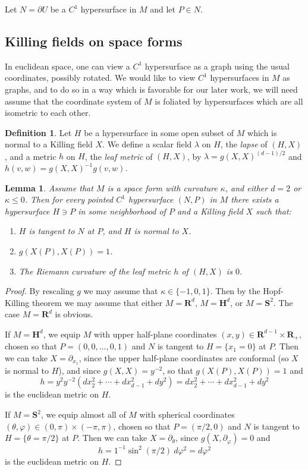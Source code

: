 \documentclass[reqno,12pt,letterpaper]{amsart}
\newcommand{\RR}{\mathbf{R}}
\newcommand{\Hyp}{\mathbf H}
\newcommand{\Sph}{\mathbf S}
\newcommand{\dfn}[1]{\emph{#1}\index{#1}}
\newtheorem{lemma}[theorem]{Lemma}
\theoremstyle{definition}
\newtheorem{definition}[theorem]{Definition}
\numberwithin{equation}{section}
\begin{document}
Let $N = \partial U$ be a $C^1$ hypersurface in $M$ and let $P \in N$.

\subsection{Killing fields on space forms}
In euclidean space, one can view a $C^1$ hypersurface as a graph using the usual coordinates, possibly rotated.
We would like to view $C^1$ hypersurfaces in $M$ as graphs, and to do so in a way which is favorable for our later work, we will need assume that the coordinate system of $M$ is foliated by hypersurfaces which are all isometric to each other.

\begin{definition}
Let $H$ be a hypersurface in some open subset of $M$ which is normal to a Killing field $X$.
We define a scalar field $\lambda$ on $H$, the \dfn{lapse} of $(H, X)$, and a metric $h$ on $H$, the \dfn{leaf metric} of $(H, X)$, by $\lambda = g(X, X)^{(d - 1)/2}$ and $h(v, w) = g(X, X)^{-1} g(v, w)$.
\end{definition}

\begin{lemma}\label{hopfKilling}
Assume that $M$ is a space form with curvature $\kappa$, and either $d = 2$ or $\kappa \leq 0$.
Then for every pointed $C^1$ hypersurface $(N, P)$ in $M$ there exists a hypersurface $H \ni P$ in some neighborhood of $P$ and a Killing field $X$ such that:
\begin{enumerate}
\item $H$ is tangent to $N$ at $P$, and $H$ is normal to $X$.
\item $g(X(P), X(P)) = 1$.
\item The Riemann curvature of the leaf metric $h$ of $(H, X)$ is $0$.
\end{enumerate}
\end{lemma}
\begin{proof}
By rescaling $g$ we may assume that $\kappa \in \{ -1, 0, 1\}$.
Then by the Hopf-Killing theorem we may assume that either $M = \RR^d$, $M = \Hyp^d$, or $M = \Sph^2$.
The case $M = \RR^d$ is obvious.

If $M = \Hyp^d$, we equip $M$ with upper half-plane coordinates $(x, y) \in \RR^{d - 1} \times \RR_+$, chosen so that $P = (0, 0, \dots, 0, 1)$ and $N$ is tangent to $H = \{x_1 = 0\}$ at $P$.
Then we can take $X = \partial_{x_1}$, since the upper half-plane coordinates are conformal (so $X$ is normal to $H$), and since $g(X, X) = y^{-2}$, so that $g(X(P), X(P)) = 1$ and
$$h = y^2y^{-2}(dx_2^2 + \cdots + dx_{d - 1}^2 + dy^2) = dx_2^2 + \cdots + dx_{d-1}^2 + dy^2$$
is the euclidean metric on $H$.

If $M = \Sph^2$, we equip almost all of $M$ with spherical coordinates $(\theta, \varphi) \in (0, \pi) \times (-\pi, \pi)$, chosen so that $P = (\pi/2, 0)$ and $N$ is tangent to $H = \{\theta = \pi/2\}$ at $P$.
Then we can take $X = \partial_\theta$, since $g(X, \partial_\varphi) = 0$ and
$$h = 1^{-1} \sin^2(\pi/2) ~d\varphi^2 = d\varphi^2$$
is the euclidean metric on $H$.
\end{proof}
\end{document}
